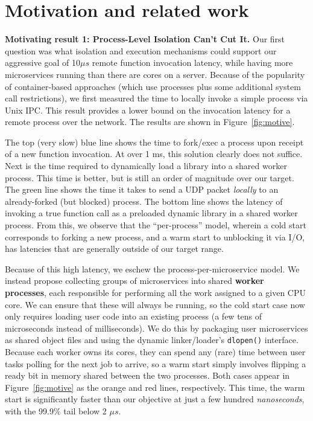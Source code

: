 \section{Motivation and related work}
\label{sec:motive}

\textbf{Motivating result 1:  Process-Level Isolation Can't Cut It.}
Our first question was what isolation and execution mechanisms could support
our aggressive goal of 10$\mu{}s$ remote function invocation latency, while
having more microservices running than there are cores on a server.
Because of the popularity of container-based approaches (which use processes
plus some additional system call restrictions), we first measured the time
to locally invoke a simple process via Unix IPC.  This result provides
a lower bound on the invocation latency for a remote process over the network.
The results are shown in Figure~\ref{fig:motive}.

The top (very slow) blue line shows the time to fork/exec a process upon receipt
of a new function invocation.  At over 1 ms, this solution clearly does not
suffice.  Next is the time required to dynamically load a library into a shared
worker process.  This time is better, but is still an order of magnitude over
our target.  The green line shows the time it takes to send a UDP packet
\emph{locally} to an already-forked (but blocked) process.  The bottom
line shows the latency of invoking a true function call as a preloaded dynamic
library in a shared worker process.  From this, we observe that the
``per-process'' model, wherein a cold start corresponds to forking a new
process, and a warm start to unblocking it via I/O, has latencies that are
generally outside of our target range.

Because of this high latency, we eschew the process-per-microservice model.
We instead propose
collecting groups of microservices into shared \textbf{worker processes},
each responsible for performing all the work assigned to a given CPU core.  We can
ensure that these will always be running, so the cold start case now only requires
loading user code into an existing process (a few tens of microseconds instead
of milliseconds).  We do this by packaging user
microservices as shared object files and using the dynamic linker/loader's
\texttt{dlopen()} interface.  Because each worker owns its cores, they can spend any
(rare) time between user tasks polling for the next job to arrive, so a warm start
simply involves flipping a ready bit in memory shared between the two processes.
Both cases appear in Figure~\ref{fig:motive} as the orange and red lines,
respectively.  This time, the warm start is significantly faster than our objective
at just a few hundred \textit{nanoseconds}, with the 99.9\% tail below 2
$\mu{}s$.

